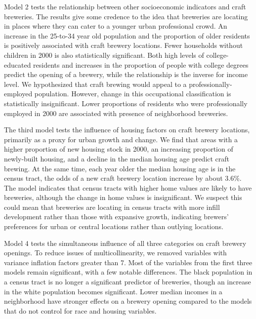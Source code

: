 \documentclass[]{article}
\begin{document}
Model 2 tests the relationship between other socioeconomic indicators
and craft breweries. The results give some credence to the idea that
breweries are locating in places where they can cater to a younger urban
professional crowd. An increase in the 25-to-34 year old population and
the proportion of older residents is positively associated with craft
brewery locations. Fewer households without children in 2000 is also
statistically significant. Both high levels of college-educated
residents and increases in the proportion of people with college degrees
predict the opening of a brewery, while the relationship is the inverse
for income level. We hypothesized that craft brewing would appeal to a
professionally-employed population. However, change in this occupational
classification is statistically insignificant. Lower proportions of
residents who were professionally employed in 2000 are associated with
presence of neighborhood breweries.

The third model tests the influence of housing factors on craft brewery
locations, primarily as a proxy for urban growth and change. We find
that areas with a higher proportion of new housing stock in 2000, an
increasing proportion of newly-built housing, and a decline in the
median housing age predict craft brewing. At the same time, each year
older the median housing age is in the census tract, the odds of a new
craft brewery location increase by about 3.6\%. The model indicates that
census tracts with higher home values are likely to have breweries,
although the change in home values is insignificant. We suspect this
could mean that breweries are locating in census tracts with more infill
development rather than those with expansive growth, indicating brewers'
preferences for urban or central locations rather than outlying
locations.

Model 4 tests the simultaneous influence of all three categories on
craft brewery openings. To reduce issues of multicollinearity, we
removed variables with variance inflation factors greater than 7. Most
of the variables from the first three models remain significant, with a
few notable differences. The black population in a census tract is no
longer a significant predictor of breweries, though an increase in the
white population becomes significant. Lower median incomes in a
neighborhood have stronger effects on a brewery opening compared to the
models that do not control for race and housing variables.
\end{document}
